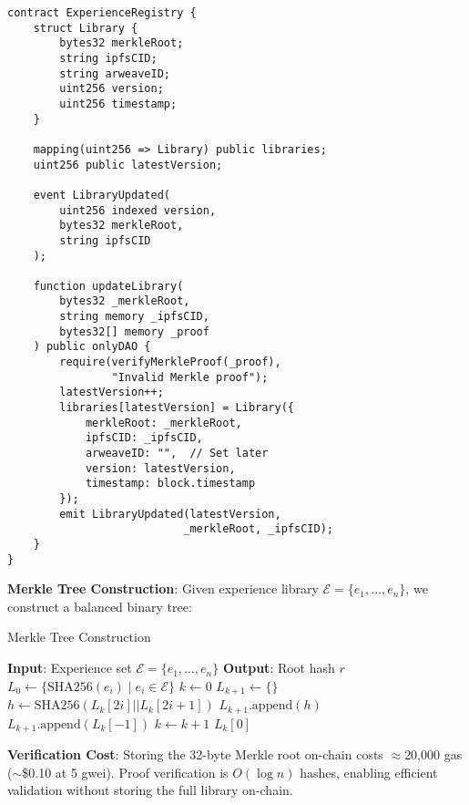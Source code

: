 \documentclass[11pt,letterpaper]{article}
\begin{document}
\begin{lstlisting}[language=Solidity,caption=Experience Registry Contract (Simplified)]
contract ExperienceRegistry {
    struct Library {
        bytes32 merkleRoot;
        string ipfsCID;
        string arweaveID;
        uint256 version;
        uint256 timestamp;
    }
    
    mapping(uint256 => Library) public libraries;
    uint256 public latestVersion;
    
    event LibraryUpdated(
        uint256 indexed version,
        bytes32 merkleRoot,
        string ipfsCID
    );
    
    function updateLibrary(
        bytes32 _merkleRoot,
        string memory _ipfsCID,
        bytes32[] memory _proof
    ) public onlyDAO {
        require(verifyMerkleProof(_proof), 
                "Invalid Merkle proof");
        latestVersion++;
        libraries[latestVersion] = Library({
            merkleRoot: _merkleRoot,
            ipfsCID: _ipfsCID,
            arweaveID: "",  // Set later
            version: latestVersion,
            timestamp: block.timestamp
        });
        emit LibraryUpdated(latestVersion, 
                           _merkleRoot, _ipfsCID);
    }
}
\end{lstlisting}

\textbf{Merkle Tree Construction}: Given experience library $\mathcal{E} = \{e_1, \ldots, e_n\}$, we construct a balanced binary tree:

\begin{algorithm}[t]
\caption{Merkle Tree Construction}
\label{alg:merkle}
\begin{algorithmic}[1]
\STATE \textbf{Input}: Experience set $\mathcal{E} = \{e_1, \ldots, e_n\}$
\STATE \textbf{Output}: Root hash $r$
\STATE $L_0 \leftarrow \{\text{SHA256}(e_i) \mid e_i \in \mathcal{E}\}$
\STATE $k \leftarrow 0$
    \STATE $L_{k+1} \leftarrow \{\}$
        \STATE $h \leftarrow \text{SHA256}(L_k[2i] || L_k[2i+1])$
        \STATE $L_{k+1}.\text{append}(h)$
    \ENDFOR
        \STATE $L_{k+1}.\text{append}(L_k[-1])$ 
    \ENDIF
    \STATE $k \leftarrow k + 1$
\ENDWHILE
\RETURN $L_k[0]$
\end{algorithmic}
\end{algorithm}

\textbf{Verification Cost}: Storing the 32-byte Merkle root on-chain costs $\approx$20,000 gas ($\sim$\$0.10 at 5 gwei). Proof verification is $O(\log n)$ hashes, enabling efficient validation without storing the full library on-chain.
\end{document}
